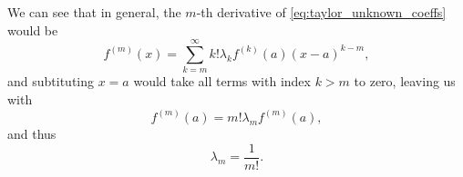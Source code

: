 We can see that in general, the $m$-th derivative of \autoref{eq:taylor_unknown_coeffs} would be
\begin{equation}
  f^{(m)}(x) = \sum\limits_{k=m}^{\infty}k!\lambda_{k}f^{(k)}(a)(x-a)^{k-m},
  \label{eq:Taylor_nth_coefficient}
\end{equation}
and subtituting $x=a$ would take all terms with index $k>m$ to zero, leaving us with
\[
  f^{(m)}(a) = m!\lambda_{m}f^{(m)}(a),
\]
and thus
\begin{equation}
  \lambda_{m} = \frac{1}{m!}.
  \label{eq:Taylor_mth_coefficient}
\end{equation}
